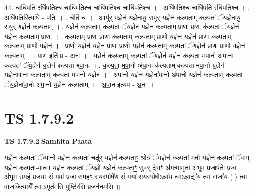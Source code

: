 \documentclass[17pt]{extarticle}
\begin{document}
44. चाधि॑पति॒ रधि॑पतिश्च॒ चाधि॑पतिश्च॒ चाधि॑पतिश्च॒ चाधि॑पतिश्च । . अधि॑पतिश्च॒ चाधि॑पति॒ रधि॑पतिश्च । . अधि॑पति॒रित्यधि॑ - प॒तिः॒ । . चेति॑ च । . आयु॑र् य॒ज्ञेन॑ य॒ज्ञेनायु॒ रायु॑र् य॒ज्ञेन॑ कल्पताम् कल्पतां ॅय॒ज्ञेनायु॒ रायु॑र् य॒ज्ञेन॑ कल्पताम् । . य॒ज्ञेन॑ कल्पताम् कल्पतां ॅय॒ज्ञेन॑ य॒ज्ञेन॑ कल्पताम् प्रा॒णः प्रा॒णः क॑ल्पतां ॅय॒ज्ञेन॑ य॒ज्ञेन॑ कल्पताम् प्रा॒णः । . क॒ल्प॒ता॒म् प्रा॒णः प्रा॒णः क॑ल्पताम् कल्पताम् प्रा॒णो य॒ज्ञेन॑ य॒ज्ञेन॑ प्रा॒णः क॑ल्पताम् कल्पताम् प्रा॒णो य॒ज्ञेन॑ । . प्रा॒णो य॒ज्ञेन॑ य॒ज्ञेन॑ प्रा॒णः प्रा॒णो य॒ज्ञेन॑ कल्पताम् कल्पतां ॅय॒ज्ञेन॑ प्रा॒णः प्रा॒णो य॒ज्ञेन॑ कल्पताम् । . प्रा॒ण इति॑ प्र - अ॒नः । . य॒ज्ञेन॑ कल्पताम् कल्पतां ॅय॒ज्ञेन॑ य॒ज्ञेन॑ कल्पता मपा॒नो अ॑पा॒नः क॑ल्पतां ॅय॒ज्ञेन॑ य॒ज्ञेन॑ कल्पता मपा॒नः । . क॒ल्प॒ता॒ म॒पा॒नो अ॑पा॒नः क॑ल्पताम् कल्पता मपा॒नो य॒ज्ञेन॑ य॒ज्ञेना॑पा॒नः क॑ल्पताम् कल्पता मपा॒नो य॒ज्ञेन॑ । . अ॒पा॒नो य॒ज्ञेन॑ य॒ज्ञेना॑पा॒नो अ॑पा॒नो य॒ज्ञेन॑ कल्पताम् कल्पतां ॅय॒ज्ञेना॑पा॒नो अ॑पा॒नो य॒ज्ञेन॑ कल्पताम् । . अ॒पा॒न इत्य॑प - अ॒नः । \newline
\pagebreak
{}
\section*{ TS 1.7.9.2 }

\textbf{TS 1.7.9.2 } \newline
\textbf{Samhita Paata} \newline

य॒ज्ञेन॑ कल्पतां ॅव्या॒नो य॒ज्ञेन॑ कल्पतां॒ चक्षु॑र् य॒ज्ञेन॑ कल्पताꣳ॒॒ श्रोत्रं॑ ॅय॒ज्ञेन॑ कल्पतां॒ मनो॑ य॒ज्ञेन॑ कल्पतां॒ ॅवाग् य॒ज्ञेन॑ कल्पता-मा॒त्मा य॒ज्ञेन॑ कल्पतां ॅय॒ज्ञो य॒ज्ञेन॑ कल्पताꣳ॒॒ सुव॑र् दे॒वाꣳ अ॑गन्मा॒मृता॑ अभूम प्र॒जाप॑तेः प्र॒जा अ॑भूम॒ सम॒हं प्र॒जया॒ सं मया᳚ प्र॒जा सम॒हꣳ रा॒यस्पोषे॑ण॒ सं मया॑ रा॒यस्पोषोऽन्ना॑य त्वा॒ऽन्नाद्या॑य त्वा॒ वाजा॑य ( ) त्वा वाजजि॒त्यायै᳚ त्वा॒ ऽमृत॑मसि॒ पुष्टि॑रसि प्र॒जन॑नमसि ॥ \newline
\end{document}
